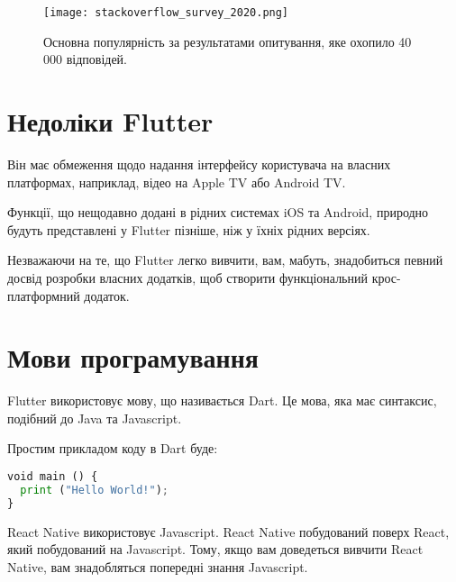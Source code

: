 \begin{figure}
    \label{fig:stackoverflow_survey_2020}
    \begin{center}
        \texttt{[image: stackoverflow\_survey\_2020.png]}
    \end{center}

    Основна популярність за результатами опитування, яке охопило 40 000 відповідей.
    \cite{stackoverflow_survey_2020}
\end{figure}

\section{Недоліки Flutter}\label{section.1.4}
\begin{enumerate}
    \begin{item}
        Він має обмеження щодо надання інтерфейсу користувача на власних платформах, наприклад, відео на Apple TV або Android TV.
    \end{item}
    \begin{item}
        Функції, що нещодавно додані в рідних системах iOS та Android, природно будуть представлені у Flutter пізніше, ніж у їхніх рідних версіях.
    \end{item}
    \begin{item}
        Незважаючи на те, що Flutter легко вивчити, вам, мабуть, знадобиться певний досвід розробки власних додатків, щоб створити функціональний крос-платформний додаток.
    \end{item}
\end{enumerate}

\section{Мови програмування}\label{section.1.5}

Flutter використовує мову, що називається Dart.
Це мова, яка має синтаксис, подібний до Java та Javascript.

Простим прикладом коду в Dart буде:
\begin{lstlisting}[style=light, language=Python,label={lst:vectorimg},caption=Dart Hello World]
void main () { 
  print ("Hello World!"); 
}
\end{lstlisting}

React Native використовує Javascript.
React Native побудований поверх React, який побудований на Javascript.
Тому, якщо вам доведеться вивчити React Native, вам знадобляться попередні знання Javascript.

